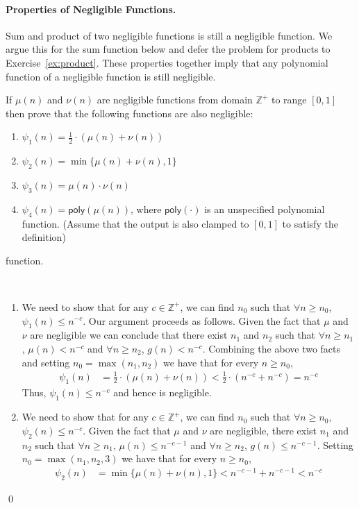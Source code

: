 \documentclass[12pt]{tufte-book}
\begin{document}
\paragraph{Properties of Negligible Functions.} Sum and product of two negligible functions is still a negligible function. We argue this for the sum function below and defer the problem for products to Exercise~\ref{ex:product}. These properties together imply that any polynomial function of a negligible function is still negligible.

\begin{exercise}
If $\mu(n)$ and $\nu(n)$ are negligible functions from domain $\mathbb{Z}^+$ to range $[0,1]$ then prove that the following functions are also negligible:
\begin{enumerate}
    \item $\psi_1(n) = \frac{1}{2} \cdot \left(\mu(n) + \nu(n)\right)$
    \item $\psi_2(n) = \min\{\mu(n) + \nu(n), 1\}$
    \item $\psi_3(n) = \mu(n)\cdot \nu(n)$
    \item $\psi_4(n) = \mathsf{poly}(\mu(n))$, where $\mathsf{poly}(\cdot)$ is an unspecified polynomial function. (Assume that the output is also clamped to $[0,1]$ to satisfy the definition)
\end{enumerate}function.
\end{exercise}
\proof 
$ $
\begin{enumerate}
    \item We need to show that for any $c \in \mathbb{Z}^+$, we can find $n_0$ such that $\forall n \geq n_0$, $\psi_1(n) \leq n^{-c}$. Our argument proceeds as follows. Given the fact that $\mu$ and $\nu$ are negligible we can conclude that there exist $n_1$ and $n_2$ such that $\forall n \geq n_1$, $\mu(n) < n^{-c}$ and $\forall n \geq n_2$, $g(n) < n^{-c}$. Combining the above two facts and setting $n_0 = \max(n_1, n_2)$ we have that for every $n \geq n_0$,
    \begin{align*}
        \psi_1(n) &= \frac{1}{2} \cdot (\mu(n) + \nu(n)) < \frac{1}{2} \cdot (n^{-c} + n^{-c}) = n^{-c}
    \end{align*}
    Thus, $\psi_1(n) \leq n^{-c}$ and hence is negligible.

    \item We need to show that for any $c \in \mathbb{Z}^+$, we can find $n_0$ such that $\forall n \geq n_0$, $\psi_2(n) \leq n^{-c}$. Given the fact that $\mu$ and $\nu$ are negligible, there exist $n_1$ and $n_2$ such that $\forall n \geq n_1$, $\mu(n) \leq n^{-c-1}$ and $\forall n \geq n_2$, $g(n) \leq n^{-c-1}$. Setting $n_0 = \max(n_1, n_2, 3)$ we have that for every $n \geq n_0$,
    \begin{align*}
        \psi_2(n) &= \min\{\mu(n) + \nu(n), 1\} < n^{-c-1} + n^{-c-1} < n^{-c}
    \end{align*}
\end{enumerate}
\qed
\end{document}
